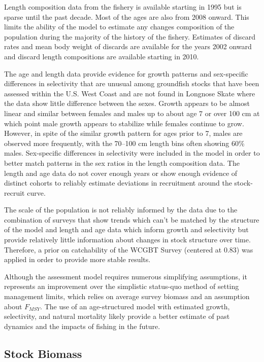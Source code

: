 \documentclass[12pt,]{article}
\begin{document}
Length composition data from the fishery is available starting in 1995
but is sparse until the past decade. Most of the ages are also from 2008
onward. This limits the ability of the model to estimate any changes
composition of the population during the majority of the history of the
fishery. Estimates of discard rates and mean body weight of discards are
available for the years 2002 onward and discard length compositions are
available starting in 2010.

The age and length data provide evidence for growth patterns and
sex-specific differences in selectivity that are unusual among
groundfish stocks that have been assessed within the U.S. West Coast and
are not found in Longnose Skate where the data show little difference
between the sexes. Growth appears to be almost linear and similar
between females and males up to about age 7 or over 100 cm at which
point male growth appears to stabilize while females continue to grow.
However, in spite of the similar growth pattern for ages prior to 7,
males are observed more frequently, with the 70--100 cm length bins
often showing 60\% males. Sex-specific differences in selectivity were
included in the model in order to better match patterns in the sex
ratios in the length composition data. The length and age data do not
cover enough years or show enough evidence of distinct cohorts to
reliably estimate deviations in recruitment around the stock-recruit
curve.

The scale of the population is not reliably informed by the data due to
the combination of surveys that show trends which can't be matched by
the structure of the model and length and age data which inform growth
and selectivity but provide relatively little information about changes
in stock structure over time. Therefore, a prior on catchability of the
WCGBT Survey (centered at 0.83) was applied in order to provide more
stable results.

Although the assessment model requires numerous simplifying assumptions,
it represents an improvement over the simplistic status-quo method of
setting management limits, which relies on average survey biomass and an
assumption about \(F_{MSY}\). The use of an age-structured model with
estimated growth, selectivity, and natural mortality likely provide a
better estimate of past dynamics and the impacts of fishing in the
future.

\hypertarget{stock-biomass}{%
\subsection*{Stock Biomass}\label{stock-biomass}}
\end{document}
